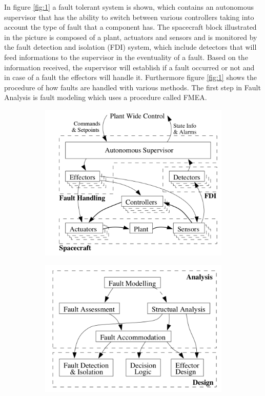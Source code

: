 In figure \ref{fig:1} a fault tolerant system is shown, which contains an autonomous supervisor that has the ability to switch between various controllers taking into account the type of fault that a component has. The spacecraft block illustrated in the picture is composed of a plant, actuators and sensors and is monitored by the fault detection and isolation (FDI) system, which include detectors that will feed informations to the supervisor in the eventuality of a fault. Based on the information received, the supervisor will establish if a fault occurred or not and in case of a fault the effectors will handle it. Furthermore figure \ref{fig:1} shows the procedure of how faults are handled with various methods. The first step in Fault Analysis is fault modeling which uses a procedure called FMEA.
\begin{figure}[H]
	\begin{minipage}[b]{0.49\linewidth}
		\centering
		\begin{figure}[H]
			\centering
			\includegraphics[width=1\linewidth]{figures/FTC}
		\end{figure}
	\end{minipage}\hfill
	\begin{minipage}[b]{0.49\linewidth}
		\centering
		\begin{figure}[H]
			\centering
			\includegraphics[width=1\linewidth]{figures/FTC_2}

\end{figure}
\end{minipage}
\end{figure}
